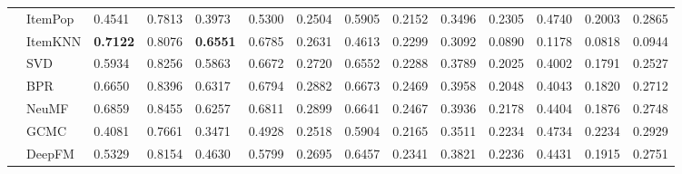 \begin{table*}[t!]
{\begin{tabular}{p{0.5cm}l|llll|llll|llll}
\multicolumn{1}{c|}{\multirow{7}{*}{}} &
ItemPop & 0.4541 & 0.7813 & 0.3973 & 0.5300 & 0.2504 & 0.5905 & 0.2152 & 0.3496  & 0.2305 & 0.4740 & 0.2003 & 0.2865 \\
\multicolumn{1}{c|}{} & ItemKNN & \textbf{0.7122} & 0.8076  & \textbf{0.6551} & 0.6785 & 0.2631 & 0.4613 & 0.2299 & 0.3092 & 0.0890 & 0.1178 & 0.0818 & 0.0944 \\
\multicolumn{1}{c|}{Without} & SVD & 0.5934                   & 0.8256                     & 0.5863                    & 0.6672                       & 0.2720                   & 0.6552                     & 0.2288                    & 0.3789                       & 0.2025                   & 0.4002                     & 0.1791                    & 0.2527                      \\
\multicolumn{1}{c|}{Prereq.} & BPR                                         & 0.6650                   & 0.8396                     & 0.6317                    & 0.6794                       & 0.2882                   & 0.6673                     & 0.2469                    & 0.3958                       & 0.2048                   & 0.4043                     & 0.1820                    & 0.2712                      \\
\multicolumn{1}{c|}{Knowl.} & NeuMF                                       & 0.6859                   & 0.8455                     & 0.6257                    & 0.6811                       & 0.2899                   & 0.6641                     & 0.2467                    & 0.3936                       & 0.2178                   & 0.4404                     & 0.1876                    & 0.2748                      \\
\multicolumn{1}{c|}{} & GCMC                                        & 0.4081                   & 0.7661                     & 0.3471                    & 0.4928                       & 0.2518                   & 0.5904                     & 0.2165                    & 0.3511                       & 0.2234                   & 0.4734                     & 0.2234                    & 0.2929                      \\
\multicolumn{1}{c|}{} & DeepFM                                      & 0.5329                   & 0.8154                     & 0.4630                    & 0.5799                       & 0.2695                   & 0.6457                     & 0.2341                    & 0.3821                       & 0.2236                   & 0.4431                     & 0.1915                    & 0.2751                      \\

\end{tabular}}
\end{table*}

